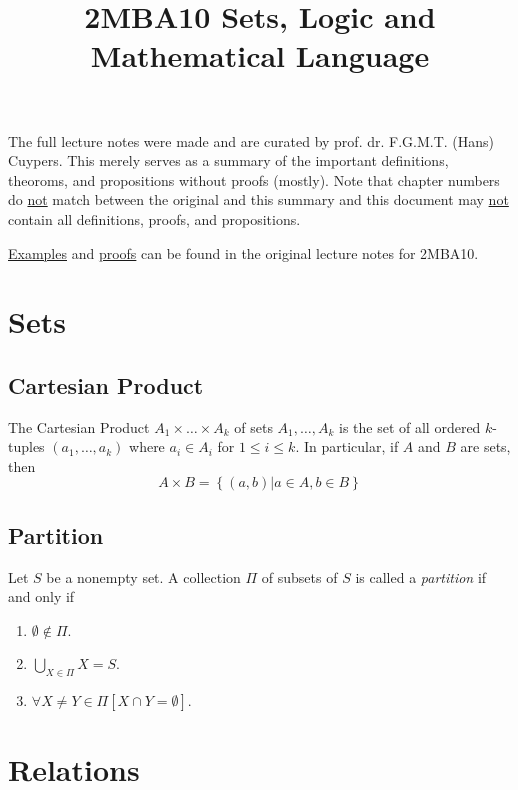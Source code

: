 \documentclass[fleqn]{article}
\author{}
\title{2MBA10 Sets, Logic and Mathematical Language}
\date{}
\begin{document}
\large
\maketitle
\vspace{-4em}


The full lecture notes were made and are curated by prof. dr. F.G.M.T. (Hans) Cuypers. This merely
serves as a summary of the important definitions, theoroms, and propositions
without proofs (mostly). Note that chapter numbers do \underline{not} match between
the original and this summary and this document may \underline{not} contain
all definitions, proofs, and propositions.

\underline{Examples} and \underline{proofs} can be found in the original lecture notes for 2MBA10.

\section{Sets}
\subsection{Cartesian Product}
The Cartesian Product $A_1 \times \dots \times A_k$ of sets $A_1, \dots, A_k$
is the set of all ordered $k$-tuples $(a_1, \dots, a_k)$ where $a_i \in A_i$ for $1 \leq i \leq k$.
In particular, if $A$ and $B$ are sets, then
\begin{equation*}
    A \times B = \left\{ (a,b) | a \in A, b \in B \right\}
\end{equation*}

\subsection{Partition}
Let $S$ be a nonempty set. A collection $\Pi$ of subsets of $S$ is called a \textit{partition}
if and only if
\begin{enumerate}
    \item $\emptyset \notin \Pi$.
    \item $\bigcup_{X\in\Pi} X = S$.
    \item $\forall X \neq Y \in \Pi \left[ X \cap Y = \emptyset \right]$.
\end{enumerate}

\section{Relations}
\end{document}
